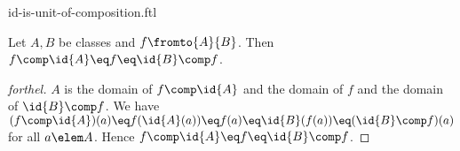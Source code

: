 \documentclass{naproche-library}
\begin{document}
\begin{smodule}[title=Identity Map is Unit of Composition]{id-is-unit-of-composition.ftl}


\begin{proposition}[forthel,id=IdIsUnitOfCompProp]
  Let $A, B$ be classes and $f \fromto{A}{B}$.
  Then $f \comp \id{A} \eq f \eq \id{B} \comp f$.
\end{proposition}
\begin{proof}[forthel]
  $A$ is the domain of $f \comp \id{A}$ and the domain of $f$ and the domain of $\id{B} \comp f$.
  We have $(f \comp \id{A})(a)
    \eq f(\id{A}(a))
    \eq f(a)
    \eq \id{B}(f(a))
    \eq (\id{B} \comp f)(a)$
  for all $a \elem A$.
  Hence $f \comp \id{A}
    \eq f
    \eq \id{B} \comp f$.
\end{proof}

\end{smodule}
\end{document}
